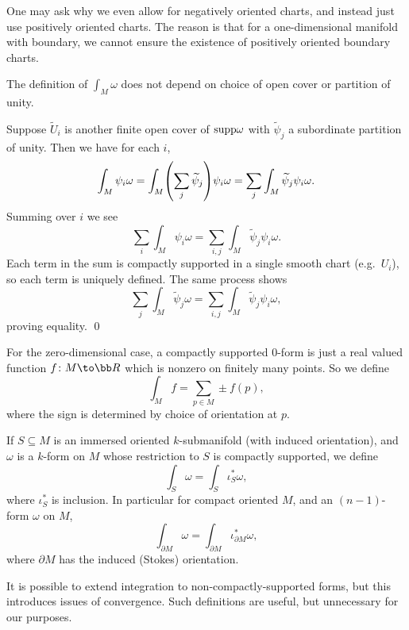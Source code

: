 \bnote

    One may ask why we even allow for negatively oriented charts, and instead just use positively oriented charts.
    The reason is that for a one-dimensional manifold with boundary, we cannot ensure the existence of positively
    oriented boundary charts.

\enote

\bprop

    The definition of $\int_M\omega$ does not depend on choice of open cover or partition of unity.

\eprop

\bproof

    Suppose $\tilde U_i$ is another finite open cover of ${\rm supp}\omega$ with $\tilde\psi_j$ a subordinate partition
    of unity.
    Then we have for each $i$,
    $$ \int_M\psi_i\omega = \int_M\mathopen{}\mathclose{\left(\sum_j\widetilde\psi_j\right)}\psi_i\omega = \sum_j\int_M\widetilde\psi_j\psi_i\omega . $$
    Summing over $i$ we see
    $$ \sum_i\int_M\psi_i\omega = \sum_{i,j}\int_M\tilde\psi_j\psi_i\omega . $$
    Each term in the sum is compactly supported in a single smooth chart (e.g.\ $U_i$), so each term is uniquely defined.
    The same process shows
    $$ \sum_j\int_M\tilde\psi_j\omega = \sum_{i,j}\int_M\tilde\psi_j\psi_i\omega , $$
    proving equality.
    \qed

\eproof

For the zero-dimensional case, a compactly supported $0$-form is just a real valued function $f\colon M\to\bR$
which is nonzero on finitely many points.
So we define
$$ \int_Mf = \sum_{p\in M}\pm f(p), $$
where the sign is determined by choice of orientation at $p$.

If $S\subseteq M$ is an immersed oriented $k$-submanifold (with induced orientation), and $\omega$ is a $k$-form
on $M$ whose restriction to $S$ is compactly supported, we define
$$ \int_S\omega = \int_S\iota^*_S\omega, $$
where $\iota^*_S$ is inclusion.
In particular for compact oriented $M$, and an $(n-1)$-form $\omega$ on $M$,
$$ \int_{\partial M}\omega = \int_{\partial M}\iota^*_{\partial M}\omega , $$
where $\partial M$ has the induced (Stokes) orientation.

\bnote

    It is possible to extend integration to non-compactly-supported forms, but this introduces issues of convergence.
    Such definitions are useful, but unnecessary for our purposes.

\enote

\bprop

